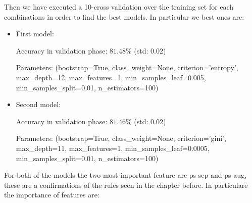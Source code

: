 \medskip

Then we have executed a 10-cross validation over the training set for each combinations in order to find the best models.
In particular we best ones are:

\medskip

\begin{itemize}
  \item First model:
  
  Accuracy in validation phase: $81.48\%$ (std: $0.02$)
  
  Parameters: (bootstrap=True, class\_weight=None, criterion='entropy',
            max\_depth=12, max\_features=1, min\_samples\_leaf=0.005, min\_samples\_split=0.01, n\_estimators=100)
            
  \item Second model:
  
  Accuracy in validation phase: $81.46\%$ (std: $0.02$)

  Parameters: (bootstrap=True, class\_weight=None, criterion='gini',
            max\_depth=11, max\_features=1, min\_samples\_leaf=0.0005, min\_samples\_split=0.01, n\_estimators=100)

\end{itemize}

\medskip

For both of the models the two most important feature are ps-sep and ps-aug, these are a confirmations of the rules seen in the chapter before. In particulare the importance of features are:

\medskip

